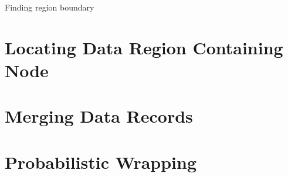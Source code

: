 
\IncMargin{2em}
\begin{algorithm}
	\DontPrintSemicolon
	\BlankLine


	\caption{Finding region boundary}
\end{algorithm}
\DecMargin{2em}

\section{Locating Data Region Containing Node}
\section{Merging Data Records}
\section{Probabilistic Wrapping}

